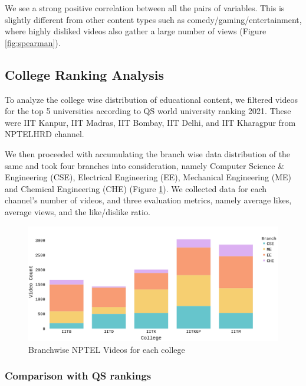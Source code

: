 \documentclass{article}
\begin{document}
We see a strong positive correlation between all the pairs of variables. This is slightly different from other content types such as comedy/gaming/entertainment, where highly disliked videos also gather a large number of views (Figure \ref{fig:spearman}).

\subsection{College Ranking Analysis}
\label{collge_rank}
To analyze the college wise distribution of educational content, we filtered videos for the top 5 universities according to QS world university ranking 2021. These were IIT Kanpur, IIT Madras, IIT Bombay, IIT Delhi, and IIT Kharagpur from NPTELHRD channel.

We then proceeded with accumulating the branch wise data distribution of the same and took four branches into consideration, namely Computer Science \& Engineering (CSE), Electrical Engineering (EE), Mechanical Engineering (ME) and Chemical Engineering (CHE) (Figure \ref{fig:branch_video_counts}). We collected data for each channel's number of videos, and three evaluation metrics, namely average likes, average views, and the like/dislike ratio.

\begin{figure}[!htpb]
    \centering
    
    \includegraphics[width=15cm]{images/video_counts.png}%
    \caption{Branchwise NPTEL Videos for each college}
    \label{fig:branch_video_counts}%
\end{figure}






\subsubsection{Comparison with QS rankings}
\end{document}
